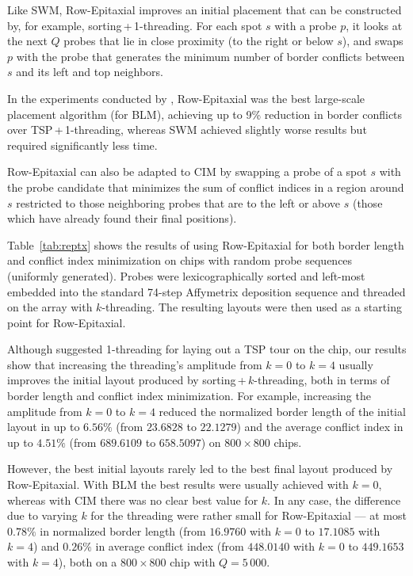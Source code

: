 Like SWM, Row-Epitaxial improves an initial placement that can be constructed
by, for example, sorting\,+\,1-threading. For each spot $s$ with a probe $p$,
it looks at the next $Q$ probes that lie in close proximity (to the right or
below $s$), and swaps $p$ with the probe that generates the minimum number of
border conflicts between $s$ and its left and top neighbors.

In the experiments conducted by \citet{Kahng2003}, Row-Epitaxial was the best
large-scale placement algorithm (for BLM), achieving up to 9\% reduction in
border conflicts over TSP\,+\,1-threading, whereas SWM achieved slightly
worse results but required significantly less time.

Row-Epitaxial can also be adapted to CIM by swapping a probe of a spot $s$ with
the probe candidate that minimizes the sum of conflict indices in a region
around $s$ restricted to those neighboring probes that are to the left or above
$s$ (those which have already found their final positions).

Table~\ref{tab:reptx} shows the results of using Row-Epitaxial for both border
length and conflict index minimization on chips with random probe sequences
(uniformly generated). Probes were lexicographically sorted and left-most
embedded into the standard 74-step Affymetrix deposition sequence and threaded
on the array with $k$-threading. The resulting layouts were then used as a
starting point for Row-Epitaxial.

Although \citet{Hannenhalli2002} suggested 1-threading for laying out a TSP tour
on the chip, our results show that increasing the threading's amplitude from
$k=0$ to $k=4$ usually improves the initial layout produced by
sorting\,+\,$k$-threading, both in terms of border length and conflict index
minimization. For example, increasing the amplitude from $k=0$ to $k=4$ reduced
the normalized border length of the initial layout in up to $6.56\%$ (from
$23.6828$ to $22.1279$) and the average conflict index in up to $4.51\%$ (from
$689.6109$ to $658.5097$) on $800\times 800$ chips.

However, the best initial layouts rarely led to the best final layout produced
by Row-Epitaxial. With BLM the best results were usually achieved with $k=0$,
whereas with CIM there was no clear best value for $k$. In any case, the
difference due to varying $k$ for the threading were rather small for
Row-Epitaxial --- at most $0.78\%$ in normalized border length (from $16.9760$
with $k=0$ to $17.1085$ with $k=4$) and $0.26\%$ in average conflict index (from
$448.0140$ with $k=0$ to $449.1653$ with $k=4$), both on a $800\times 800$ chip
with $Q=5\,000$.

